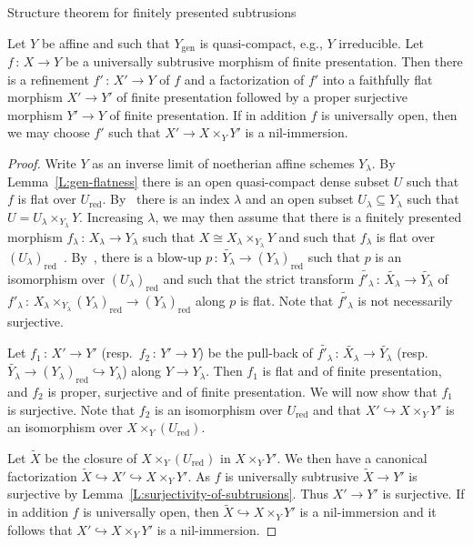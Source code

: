 \documentclass[a4paper,twoside,11pt]{amsart}[2009/07/02] %
\newcommand{\pref}[1]{\eqref{#1}}
\newcommand{\inj}{\hookrightarrow}
\newcommand{\iso}{\cong} %
\newcommand{\map}[3]{#1\,:\, #2\rightarrow #3}
\newcommand{\genpts}{\mathrm{gen}} %
\newcommand{\red}{\mathrm{red}}
\begin{document}
\begin{section}{Structure theorem for finitely presented subtrusions}
\begin{proposition}\label{P:ST-aff+q-compact}
Let $Y$ be affine and such that $Y_\genpts$ is quasi-compact, e.g., $Y$
irreducible. Let $\map{f}{X}{Y}$ be a universally subtrusive morphism of finite
presentation. Then there is a refinement $\map{f'}{X'}{Y}$ of $f$ and a
factorization of $f'$ into a faithfully flat morphism $X'\to Y'$ of finite
presentation followed by a proper surjective morphism $Y'\to Y$ of finite
presentation. If in addition $f$ is universally open, then we may choose
$f'$ such that $X'\to X\times_Y Y'$ is a nil-immersion.
\end{proposition}
\begin{proof}
Write $Y$ as an inverse limit of noetherian affine schemes $Y_\lambda$. By
Lemma~\pref{L:gen-flatness} there is an open quasi-compact dense subset $U$
such that $f$ is flat over $U_\red$. By~\cite[Cor.~8.2.11]{egaIV} there is an
index $\lambda$ and an open subset $U_\lambda\subseteq Y_\lambda$ such that
$U=U_\lambda\times_{Y_\lambda} Y$. Increasing $\lambda$, we may then assume
that there is a finitely presented morphism
$\map{f_\lambda}{X_\lambda}{Y_\lambda}$ such that $X\iso
X_\lambda\times_{Y_\lambda} Y$ and such that $f_\lambda$ is flat over
$(U_\lambda)_\red$~\cite[Thm.~11.2.6]{egaIV}.
By~\cite[Thm.~5.2.2]{raynaud-gruson}, there is a blow-up
$\map{p}{\widetilde{Y_\lambda}}{(Y_\lambda)_\red}$ such that $p$ is an
isomorphism over $(U_\lambda)_\red$ and such that the strict transform
$\map{\widetilde{f'_\lambda}}{\widetilde{X_\lambda}}{\widetilde{Y_\lambda}}$ of
$\map{f'_\lambda}{X_\lambda\times_{Y_\lambda}
(Y_\lambda)_\red}{(Y_\lambda)_\red}$ along $p$ is flat. Note that
$\widetilde{f'_\lambda}$ is not necessarily surjective.

Let $\map{f_1}{X'}{Y'}$ (resp.\ $\map{f_2}{Y'}{Y}$) be the pull-back of
$\map{\widetilde{f'_\lambda}}{\widetilde{X_\lambda}}{\widetilde{Y_\lambda}}$
(resp.\ $\widetilde{Y_\lambda}\to (Y_\lambda)_\red\inj Y_\lambda$) along $Y\to
Y_\lambda$. Then $f_1$ is flat and of finite presentation, and $f_2$ is proper,
surjective and of finite presentation. We will now show that $f_1$ is
surjective. Note that $f_2$ is an isomorphism over $U_\red$ and that $X'\inj
X\times_Y Y'$ is an isomorphism over $X\times_Y \left(U_\red\right)$.

Let $\widetilde{X}$ be the closure of $X\times_Y \left(U_\red\right)$ in
$X\times_Y Y'$. We then have a canonical factorization $\widetilde{X}\inj
X'\inj X\times_Y Y'$. As $f$ is universally subtrusive $\widetilde{X}\to Y'$
is surjective by Lemma~\pref{L:surjectivity-of-subtrusions}. Thus $X'\to Y'$ is
surjective. If in addition $f$ is universally open, then $\widetilde{X}\inj
X\times_Y Y'$ is a nil-immersion and it follows that $X'\inj X\times_Y Y'$ is a
nil-immersion.
\end{proof}


\end{section}
\end{document}

